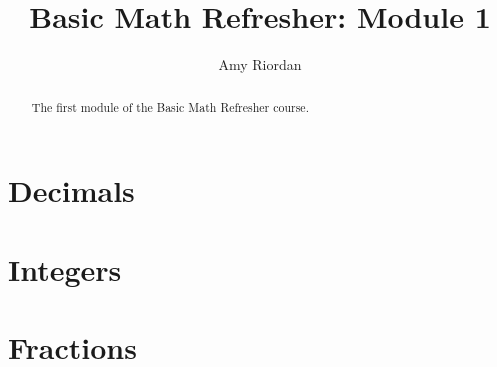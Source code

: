 \documentclass{xourse}
\title{Basic Math Refresher: Module 1}
\author{Amy Riordan}
\begin{document}
\begin{abstract}
    The first module of the Basic Math Refresher course.
\end{abstract}
\maketitle

\part{Decimals}


\part{Integers}


\part{Fractions}

\end{document}
